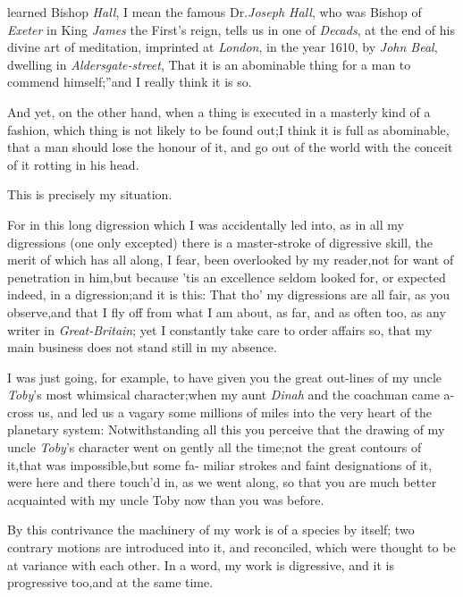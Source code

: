 \documentclass{article}
\begin{document}
 learned Bishop \textit{Hall}, I mean\break 
the famous Dr.\@ \textit{Joseph Hall}, who\break
was Bishop of
\textit{Exeter} in King \textit{James} the First’s reign, tells
us in one of \textit{Decads}, at the end of his divine art of
meditation, imprinted at \textit{London}, in the year 1610, by
\textit{John Beal}, dwelling in
\textit{Aldersgate-street},
\noindent \lqq That it is an abominable thing for a man to commend himself;”\tsh  and I
really think it is so.

And yet, on the other hand, when a thing is executed in a
masterly kind of a fashion, which thing is not likely to be found
out;\tsk  I think it is full as abominable, that a man should lose
the honour of it, and go out of the world with the conceit of it
rotting in his head.

This is precisely my situation.

For in this long digression which I was accidentally led into,
as in all my digressions (one only excepted) there is a
master-stroke of digressive skill, the merit of which has all
along, I fear, been overlooked by my reader,\tsk  not for want of
penetration in him,\tsk  but because ’tis an excellence
seldom looked for, or expected indeed, in a digression;\tsk  and
it is this: That tho’ my digressions are all fair, as you
observe,\tsk  and that I fly off from what I am about, as far, and
as often too, as any writer in \textit{Great-Britain}; yet I
constantly take care to order affairs so, that my main business does
not stand still in my absence.

I was just going, for example, to have given you the great
out-lines of my uncle \textit{Toby}’s most whimsical
character;\tsk  when my aunt \textit{Dinah} and the coachman came
a-cross us, and led us a vagary some millions of miles into the very
heart of the planetary system: Notwithstanding all this you
perceive that the drawing of my uncle \textit{Toby}’s character
went on gently all the time;\tsk  not the great contours of
it,\tsk  that was impossible,\tsk  but some fa- miliar strokes and
faint designations of it, were here and there touch’d in, as
we went along, so that you are much better acquainted with my uncle
Toby now than you was before.

By this contrivance the machinery of my work is of a species by
itself; two contrary motions are introduced into it, and
reconciled, which were thought to be at variance with each other.
In a word, my work is digressive, and it is progressive
too,\tsk  and at the same time.
\end{document}

